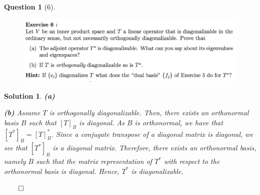 \documentclass{article} %
\theoremstyle{quest}
\newtheorem*{question}{Question}
\newtheorem*{solution}{Solution}
\begin{document}
\pagebreak

\begin{question}[6]
\hfill
\begin{figure}[h!]
  \centering
    \includegraphics[width=1\textwidth]{LA-2-6.png}
\end{figure}
\end{question}
\begin{solution}
\textbf{(a)}


\textbf{(b)} Assume $T$ is orthogonally diagonalizable. Then, there exists an orthonormal 
basis $B$ such that $[T]_{B}$ is diagonal. As $B$ is orthonormal, we have that $[T^*]_{B}
= [T]_{B}^*$. Since a conjugate transpose of a diagonal matrix is diagonal, we see that
$[T^*]_{B}$ is a diagonal matrix. Therefore, there exists an orthonormal basis, namely $B$
such that the matrix representation of $T^*$ with respect to the orthonormal basis is diagonal.
Hence, $T^*$ is diagonalizable. 

\hfill $\qed$
  
\end{solution}

\newpage
\end{document}
